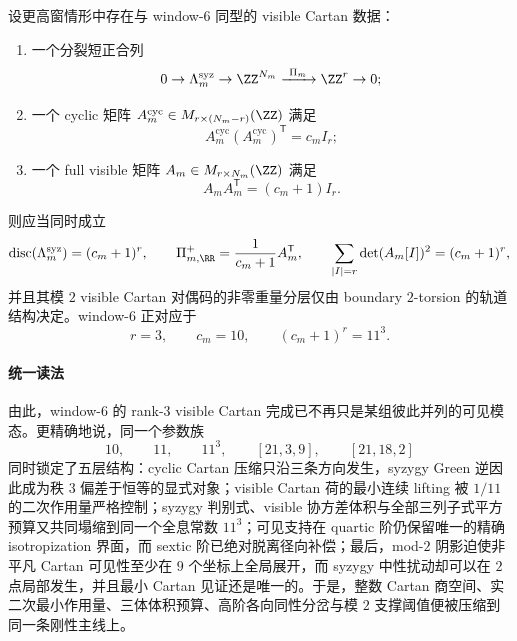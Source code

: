 \begin{conjecture}\label{conj:conclusion-window-visible-cartan-rank-r-holographic-rigidity}
设更高窗情形中存在与 window-\(6\) 同型的 visible Cartan 数据：
\begin{enumerate}
  \item 一个分裂短正合列
  \[
  0\to \Lambda_m^{\mathrm{syz}}\to \ZZ^{N_m}\xrightarrow{\ \Pi_m\ }\ZZ^r\to 0;
  \]
  \item 一个 cyclic 矩阵 \(A_m^{\mathrm{cyc}}\in M_{r\times (N_m-r)}(\ZZ)\) 满足
  \[
  A_m^{\mathrm{cyc}}(A_m^{\mathrm{cyc}})^{\mathsf T}=c_mI_r;
  \]
  \item 一个 full visible 矩阵 \(A_m\in M_{r\times N_m}(\ZZ)\) 满足
  \[
  A_mA_m^{\mathsf T}=(c_m+1)I_r.
  \]
\end{enumerate}
则应当同时成立
\[
\operatorname{disc}(\Lambda_m^{\mathrm{syz}})=(c_m+1)^r,
\qquad
\Pi_{m,\RR}^+=\frac{1}{c_m+1}A_m^{\mathsf T},
\qquad
\sum_{|I|=r}\det(A_m[I])^2=(c_m+1)^r,
\]
并且其模 \(2\) visible Cartan 对偶码的非零重量分层仅由 boundary \(2\)-torsion 的轨道结构决定。window-\(6\) 正对应于
\[
r=3,
\qquad
c_m=10,
\qquad
(c_m+1)^r=11^3.
\]
\end{conjecture}

\paragraph{统一读法}
由此，window-\(6\) 的 rank-\(3\) visible Cartan 完成已不再只是某组彼此并列的可见模态。更精确地说，同一个参数族
\[
10,\qquad 11,\qquad 11^3,\qquad [21,3,9],\qquad [21,18,2]
\]
同时锁定了五层结构：cyclic Cartan 压缩只沿三条方向发生，syzygy Green 逆因此成为秩 \(3\) 偏差于恒等的显式对象；visible Cartan 荷的最小连续 lifting 被 \(1/11\) 的二次作用量严格控制；syzygy 判别式、visible 协方差体积与全部三列子式平方预算又共同塌缩到同一个全息常数 \(11^3\)；可见支持在 quartic 阶仍保留唯一的精确 isotropization 界面，而 sextic 阶已绝对脱离径向补偿；最后，mod-\(2\) 阴影迫使非平凡 Cartan 可见性至少在 \(9\) 个坐标上全局展开，而 syzygy 中性扰动却可以在 \(2\) 点局部发生，并且最小 Cartan 见证还是唯一的。于是，整数 Cartan 商空间、实二次最小作用量、三体体积预算、高阶各向同性分岔与模 \(2\) 支撑阈值便被压缩到同一条刚性主线上。

\endinput
